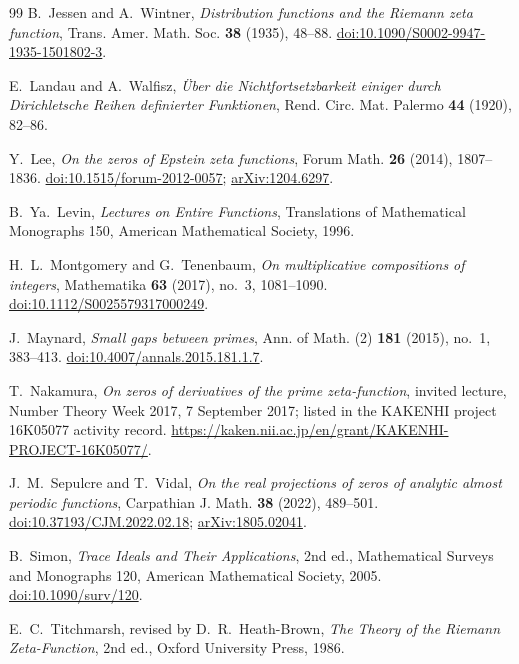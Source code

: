 \documentclass[11pt]{article}
\theoremstyle{definition}
\theoremstyle{remark}
\begin{document}
\begin{thebibliography}{99}
B.~Jessen and A.~Wintner,
\emph{Distribution functions and the Riemann zeta function},
Trans. Amer. Math. Soc. \textbf{38} (1935), 48--88.
\href{https://doi.org/10.1090/S0002-9947-1935-1501802-3}
{doi:10.1090/S0002-9947-1935-1501802-3}.

E.~Landau and A.~Walfisz,
\emph{\"Uber die Nichtfortsetzbarkeit einiger durch Dirichletsche Reihen definierter
Funktionen},
Rend. Circ. Mat. Palermo \textbf{44} (1920), 82--86.

Y.~Lee,
\emph{On the zeros of Epstein zeta functions},
Forum Math. \textbf{26} (2014), 1807--1836.
\href{https://doi.org/10.1515/forum-2012-0057}{doi:10.1515/forum-2012-0057};
\href{https://arxiv.org/abs/1204.6297}{arXiv:1204.6297}.

B.~Ya.~Levin,
\emph{Lectures on Entire Functions},
Translations of Mathematical Monographs 150, American Mathematical Society, 1996.

H.~L.~Montgomery and G.~Tenenbaum,
\emph{On multiplicative compositions of integers},
Mathematika \textbf{63} (2017), no.~3, 1081--1090.
\href{https://doi.org/10.1112/S0025579317000249}
{doi:10.1112/S0025579317000249}.

J.~Maynard,
\emph{Small gaps between primes},
Ann. of Math. (2) \textbf{181} (2015), no.~1, 383--413.
\href{https://doi.org/10.4007/annals.2015.181.1.7}
{doi:10.4007/annals.2015.181.1.7}.

T.~Nakamura,
\emph{On zeros of derivatives of the prime zeta-function},
invited lecture, Number Theory Week 2017, 7 September 2017; listed in the
KAKENHI project 16K05077 activity record.
\url{https://kaken.nii.ac.jp/en/grant/KAKENHI-PROJECT-16K05077/}.

J.~M.~Sepulcre and T.~Vidal,
\emph{On the real projections of zeros of analytic almost periodic functions},
Carpathian J. Math. \textbf{38} (2022), 489--501.
\href{https://doi.org/10.37193/CJM.2022.02.18}{doi:10.37193/CJM.2022.02.18};
\href{https://arxiv.org/abs/1805.02041}{arXiv:1805.02041}.

B.~Simon,
\emph{Trace Ideals and Their Applications}, 2nd ed.,
Mathematical Surveys and Monographs 120, American Mathematical Society, 2005.
\href{https://doi.org/10.1090/surv/120}{doi:10.1090/surv/120}.

E.~C.~Titchmarsh, revised by D.~R.~Heath-Brown,
\emph{The Theory of the Riemann Zeta-Function}, 2nd ed.,
Oxford University Press, 1986.

\end{thebibliography}
\end{document}
